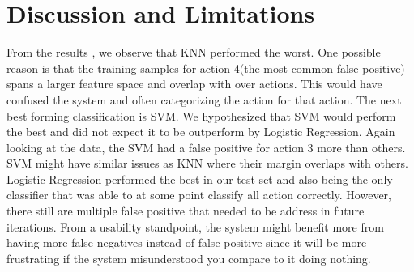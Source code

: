 \section{Discussion and Limitations}
From the results , we observe that KNN performed the worst. One possible reason is that the training samples for action 4(the most common false positive) spans a larger feature space and overlap with over actions. This would have confused the system and often categorizing the action for that action. The next best forming classification is SVM. We hypothesized that SVM would perform the best and did not expect it to be outperform by Logistic Regression. Again looking at the data, the SVM had a false positive for action 3 more than others. SVM might have similar issues as KNN where their margin overlaps with others. Logistic Regression performed the best in our test set and also being the only classifier that was able to at some point classify all action correctly. However, there still are multiple false positive that needed to be address in future iterations. From a usability standpoint, the system might benefit more from having more false negatives instead of false positive since it will be more frustrating if the system misunderstood you compare to it doing nothing.
